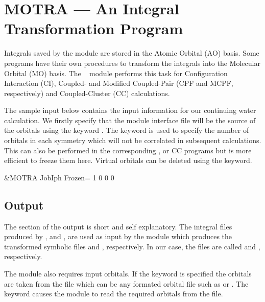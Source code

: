 \section{MOTRA --- An Integral Transformation Program}
\label{TUT:sec:motra}
Integrals saved by the  module
are stored in the Atomic Orbital (AO) basis.  Some programs have their own
procedures to transform the integrals into the Molecular Orbital (MO) basis.
The \molcas\  module performs this task for
Configuration Interaction (CI), Coupled- and Modified Coupled-Pair (CPF and
MCPF, respectively) and Coupled-Cluster (CC) calculations.

The sample input below contains the  input
information for our continuing water calculation.  We firstly specify that the
 module interface file will be the source of the
orbitals using the keyword .  The keyword
 is used to specify the number of orbitals  in each
symmetry which will not be correlated in
subsequent calculations.  This can also be performed in the corresponding
,  or CC programs
but is more efficient to freeze them here.  
Virtual orbitals can be deleted using the  keyword.

\begin{inputlisting}
 &MOTRA
JobIph
Frozen= 1 0 0 0
\end{inputlisting}

\subsection{ Output}

The  section of the output is short and self
explanatory.  The integral files produced by ,  
and , are used as input by the
 module which produces the transformed symbolic files
 and , respectively. In our case, the files
are called  and , respectively.
 

The  module also requires input orbitals.
If the  keyword is specified the orbitals are taken
from the  file which can be any formated orbital
file such as  or .  The 
 keyword causes the  module to
read the required orbitals from the  file.

